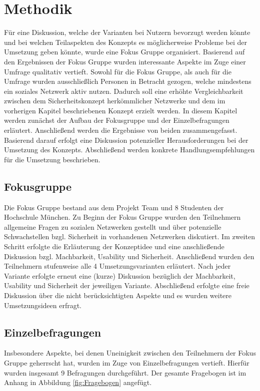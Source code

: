 \documentclass{sigchi}
\begin{document}
\section{Methodik}
Für eine Diskussion, welche der Varianten bei Nutzern bevorzugt werden könnte und bei welchen Teilaspekten des Konzepts es möglicherweise Probleme bei der Umsetzung geben könnte, wurde eine Fokus Gruppe organisiert. Basierend auf den Ergebnissen der Fokus Gruppe wurden interessante Aspekte im Zuge einer Umfrage qualitativ vertieft. Sowohl für die Fokus Gruppe, als auch für die Umfrage wurden ausschließlich Personen in Betracht gezogen, welche mindestens ein soziales Netzwerk aktiv nutzen. Dadurch soll eine erhöhte Vergleichbarkeit zwischen dem Sicherheitskonzept herkömmlicher Netzwerke und dem im vorherigen Kapitel beschriebenen Konzept erzielt werden. In diesem Kapitel werden zunächst der Aufbau der Fokusgruppe und der Einzelbefragungen erläutert. Anschließend werden die Ergebnisse von beiden zusammengefasst. Basierend darauf erfolgt eine Diskussion potenzieller Herausforderungen bei der Umsetzung des Konzepts. Abschließend werden konkrete Handlungsempfehlungen für die Umsetzung beschrieben.

\subsection{Fokusgruppe}
\label{Fokusgruppe}
Die Fokus Gruppe bestand aus dem Projekt Team und 8 Studenten der Hochschule München. Zu Beginn der Fokus Gruppe wurden den Teilnehmern allgemeine Fragen zu sozialen Netzwerken gestellt und über potenzielle Schwachstellen bzgl. Sicherheit in vorhandenen Netzwerken diskutiert. Im zweiten Schritt erfolgte die Erläuterung der Konzeptidee und eine anschließende Diskussion bzgl. Machbarkeit, Usability und Sicherheit. Anschließend wurden den Teilnehmern stufenweise alle 4 Umsetzungsvarianten erläutert. Nach jeder Variante erfolgte erneut eine (kurze) Diskussion bezüglich der Machbarkeit, Usability und Sicherheit der jeweiligen Variante. Abschließend erfolgte eine freie Diskussion über die nicht berücksichtigten Aspekte und es wurden weitere Umsetzungsideen erfragt.
 
\subsection{Einzelbefragungen}
\label{Einzelbefragung}
Insbesondere Aspekte, bei denen Uneinigkeit zwischen den Teilnehmern der Fokus Gruppe geherrscht hat, wurden im Zuge von Einzelbefragungen vertieft. Hierfür wurden insgesamt 9 Befragungen durchgeführt. Der gesamte Fragebogen ist im Anhang in Abbildung \ref{fig:Fragebogen} angefügt.
\end{document}

